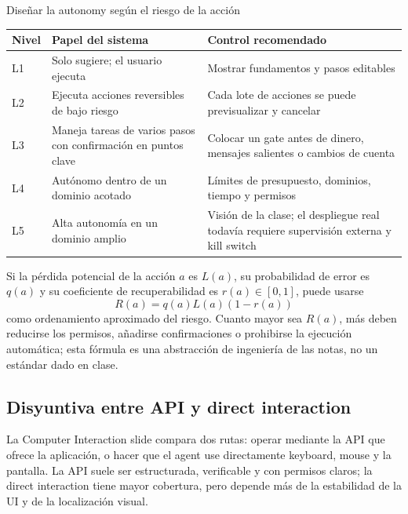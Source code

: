 \documentclass[a4paper]{article}
\begin{document}
\begin{importantbox}{Diseñar la autonomy según el riesgo de la acción}
\begin{tabularx}{\textwidth}{L{0.10\textwidth}>{\raggedright\arraybackslash}X >{\raggedright\arraybackslash}X}
\toprule
Nivel & Papel del sistema & Control recomendado \\
\midrule
L1 & Solo sugiere; el usuario ejecuta & Mostrar fundamentos y pasos editables \\
L2 & Ejecuta acciones reversibles de bajo riesgo & Cada lote de acciones se puede previsualizar y cancelar \\
L3 & Maneja tareas de varios pasos con confirmación en puntos clave & Colocar un gate antes de dinero, mensajes salientes o cambios de cuenta \\
L4 & Autónomo dentro de un dominio acotado & Límites de presupuesto, dominios, tiempo y permisos \\
L5 & Alta autonomía en un dominio amplio & Visión de la clase; el despliegue real todavía requiere supervisión externa y kill switch \\
\bottomrule
\end{tabularx}
\end{importantbox}

Si la pérdida potencial de la acción $a$ es $L(a)$, su probabilidad de error es $q(a)$ y su coeficiente de recuperabilidad es $r(a)\in[0,1]$, puede usarse
\[
R(a)=q(a)L(a)(1-r(a))
\]
como ordenamiento aproximado del riesgo. Cuanto mayor sea $R(a)$, más deben reducirse los permisos, añadirse confirmaciones o prohibirse la ejecución automática; esta fórmula es una abstracción de ingeniería de las notas, no un estándar dado en clase.


\subsection{Disyuntiva entre API y direct interaction}

La Computer Interaction slide compara dos rutas: operar mediante la API que ofrece la aplicación, o hacer que el agent use directamente keyboard, mouse y la pantalla. La API suele ser estructurada, verificable y con permisos claros; la direct interaction tiene mayor cobertura, pero depende más de la estabilidad de la UI y de la localización visual.
\end{document}
